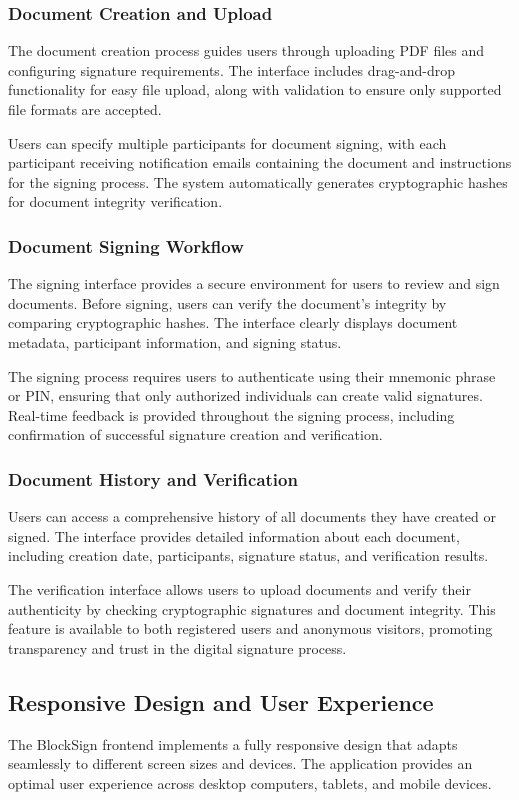 \subsubsection{Document Creation and Upload}
The document creation process guides users through uploading PDF files and configuring signature requirements. The interface includes drag-and-drop functionality for easy file upload, along with validation to ensure only supported file formats are accepted.

Users can specify multiple participants for document signing, with each participant receiving notification emails containing the document and instructions for the signing process. The system automatically generates cryptographic hashes for document integrity verification.

\subsubsection{Document Signing Workflow}
The signing interface provides a secure environment for users to review and sign documents. Before signing, users can verify the document's integrity by comparing cryptographic hashes. The interface clearly displays document metadata, participant information, and signing status.

The signing process requires users to authenticate using their mnemonic phrase or PIN, ensuring that only authorized individuals can create valid signatures. Real-time feedback is provided throughout the signing process, including confirmation of successful signature creation and verification.

\subsubsection{Document History and Verification}
Users can access a comprehensive history of all documents they have created or signed. The interface provides detailed information about each document, including creation date, participants, signature status, and verification results.

The verification interface allows users to upload documents and verify their authenticity by checking cryptographic signatures and document integrity. This feature is available to both registered users and anonymous visitors, promoting transparency and trust in the digital signature process.

\subsection{Responsive Design and User Experience}
The BlockSign frontend implements a fully responsive design that adapts seamlessly to different screen sizes and devices. The application provides an optimal user experience across desktop computers, tablets, and mobile devices.

